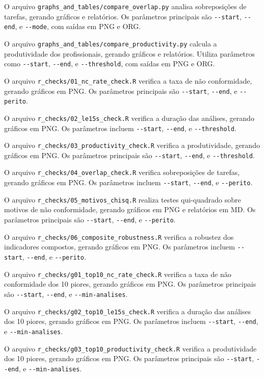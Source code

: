 \documentclass[11pt]{article}
\begin{document}
O arquivo \texttt{graphs\_and\_tables/compare\_overlap.py} analisa sobreposições de tarefas, gerando gráficos e relatórios. Os parâmetros principais são \texttt{-{}-start}, \texttt{-{}-end}, e \texttt{-{}-mode}, com saídas em PNG e ORG.

O arquivo \texttt{graphs\_and\_tables/compare\_productivity.py} calcula a produtividade dos profissionais, gerando gráficos e relatórios. Utiliza parâmetros como \texttt{-{}-start}, \texttt{-{}-end}, e \texttt{-{}-threshold}, com saídas em PNG e ORG.

O arquivo \texttt{r\_checks/01\_nc\_rate\_check.R} verifica a taxa de não conformidade, gerando gráficos em PNG. Os parâmetros principais são \texttt{-{}-start}, \texttt{-{}-end}, e \texttt{-{}-perito}.

O arquivo \texttt{r\_checks/02\_le15s\_check.R} verifica a duração das análises, gerando gráficos em PNG. Os parâmetros incluem \texttt{-{}-start}, \texttt{-{}-end}, e \texttt{-{}-threshold}.

O arquivo \texttt{r\_checks/03\_productivity\_check.R} verifica a produtividade, gerando gráficos em PNG. Os parâmetros principais são \texttt{-{}-start}, \texttt{-{}-end}, e \texttt{-{}-threshold}.

O arquivo \texttt{r\_checks/04\_overlap\_check.R} verifica sobreposições de tarefas, gerando gráficos em PNG. Os parâmetros incluem \texttt{-{}-start}, \texttt{-{}-end}, e \texttt{-{}-perito}.

O arquivo \texttt{r\_checks/05\_motivos\_chisq.R} realiza testes qui-quadrado sobre motivos de não conformidade, gerando gráficos em PNG e relatórios em MD. Os parâmetros principais são \texttt{-{}-start}, \texttt{-{}-end}, e \texttt{-{}-perito}.

O arquivo \texttt{r\_checks/06\_composite\_robustness.R} verifica a robustez dos indicadores compostos, gerando gráficos em PNG. Os parâmetros incluem \texttt{-{}-start}, \texttt{-{}-end}, e \texttt{-{}-perito}.

O arquivo \texttt{r\_checks/g01\_top10\_nc\_rate\_check.R} verifica a taxa de não conformidade dos 10 piores, gerando gráficos em PNG. Os parâmetros principais são \texttt{-{}-start}, \texttt{-{}-end}, e \texttt{-{}-min-analises}.

O arquivo \texttt{r\_checks/g02\_top10\_le15s\_check.R} verifica a duração das análises dos 10 piores, gerando gráficos em PNG. Os parâmetros incluem \texttt{-{}-start}, \texttt{-{}-end}, e \texttt{-{}-min-analises}.

O arquivo \texttt{r\_checks/g03\_top10\_productivity\_check.R} verifica a produtividade dos 10 piores, gerando gráficos em PNG. Os parâmetros principais são \texttt{-{}-start}, \texttt{-{}-end}, e \texttt{-{}-min-analises}.
\end{document}
